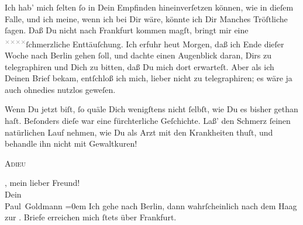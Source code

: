 \pstart
           Ich hab’ mich{ }ſelten{ }ſo in Dein \strikeout{\textcolor{gray}{×}}{ }{\pb}Empfinden hineinverſetzen können, wie \strikeout{\textcolor{gray}{gege}} in dieſem Falle, und ich meine, wenn ich bei Dir wäre, könnte ich Dir \strikeout{\textcolor{gray}{m}} Manches Tröſtliche{ }ſagen. Daß Du nicht nach Frankfurt kommen magſt, bringt mir eine \substVorne{}\textsuperscript{\textcolor{gray}{×}\-\textcolor{gray}{×}\-\textcolor{gray}{×}\-\textcolor{gray}{×}}\substDazwischen{}ſchmerzliche\substHinten{} Enttäuſchung. Ich erfuhr heut{ }Morgen, daß ich Ende dieſer Woche nach Berlin gehen{ }ſoll, und dachte einen Augenblick daran, Dirs zu telegraphiren
               und \introOben{}Dich\introOben{} zu bitten,  daß
               Du mich dort erwarteſt. Aber  als ich Deinen Brief bekam, entſchloß ich mich, lieber nicht zu telegraphiren;
               es wäre ja auch ohnedies nutzlos geweſen.\pend
           
\pstart
           Wenn Du jetzt \label{K_L02874-3v}\label{K_L02874-3}{ } biſt,{ }ſo quäle Dich
               wenigſtens nicht{ }ſelbſt, wie Du es bisher gethan haſt. Beſonders {\pb}dieſe \label{K_L02874-4v}\label{K_L02874-4} war eine fürchterliche Geſchichte. Laß’ den Schmerz{ }ſeinen natürlichen Lauf
               nehmen, wie Du als Arzt mit den Krankheiten thuſt, und behandle ihn nicht mit
               Gewaltkuren!\pend
           
\pstart
           \begin{otherlanguage}{french}\textsc{Adieu}\end{otherlanguage}, mein lieber Freund! {\\[\baselineskip]}Dein {\\[\baselineskip]}\spacefill\mbox{Paul Goldmann}\pend
           \leftskip=0em{}
\pstart
           \noindent{}Ich gehe nach Berlin, dann wahrſcheinlich nach
                  dem Haag zur \label{K_L02874-5v}\label{K_L02874-5}.  Briefe erreichen mich{ }ſtets über Frankfurt.\pend
           \endnumbering{}  \newcommand{\dateiname}{L02874}\newcommand{\titel}{Paul Goldmann an Arthur Schnitzler, 1. 5. 1899}\newcommand{\editorInnen}{Martin Anton Müller und Laura Untner}
